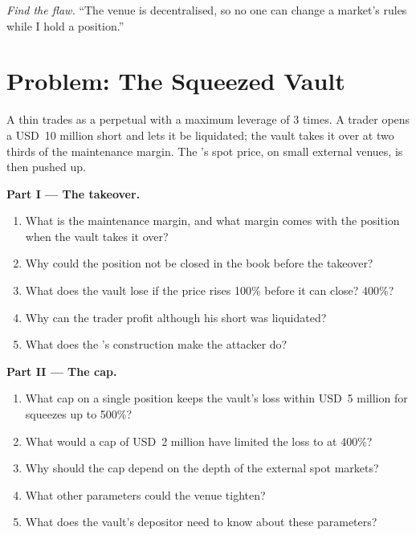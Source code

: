 \begin{exercise}[$\star\star\star$]\label{exo:m3:on-chain-order-books-and-perpetual-dexs:8}
\emph{Find the flaw.} ``The venue is decentralised, so no one can change a market's rules while I hold a position.''
\end{exercise}

\section{Problem: The Squeezed Vault}

\begin{problem}\label{pb:m3:on-chain-order-books-and-perpetual-dexs:1}
A thin  trades as a perpetual with a maximum leverage of 3 times. A trader opens a USD~10 million short and lets it be liquidated; the vault takes it over at two
thirds of the maintenance margin. The 's spot price, on small external venues, is then pushed up.

\medskip\noindent\textbf{Part I --- The takeover.}
\begin{enumerate}
\item What is the maintenance margin, and what margin comes with the position when the vault takes it over?
\item Why could the position not be closed in the book before the takeover?
\item What does the vault lose if the price rises 100\% before it can close? 400\%?
\item Why can the trader profit although his short was liquidated?
\item What does the 's construction make the attacker do?
\end{enumerate}

\medskip\noindent\textbf{Part II --- The cap.}
\begin{enumerate}[resume]
\item What cap on a single position keeps the vault's loss within USD~5 million for squeezes up to 500\%?
\item What would a cap of USD~2 million have limited the loss to at 400\%?
\item Why should the cap depend on the depth of the external spot markets?
\item What other parameters could the venue tighten?
\item What does the vault's depositor need to know about these parameters?
\end{enumerate}


\end{problem}
